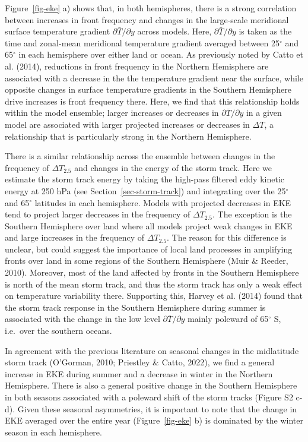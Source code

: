 \documentclass[
]{agujournal2019}
\begin{document}
Figure~\ref{fig-eke} a) shows that, in both hemispheres, there is a
strong correlation between increases in front frequency and changes in
the large-scale meridional surface temperature gradient
\(\partial \bar{T} / \partial y\) across models. Here,
\(\partial \bar{T} / \partial y\) is taken as the time and zonal-mean
meridional temperature gradient averaged between 25\(^{\circ}\) and
65\(^{\circ}\) in each hemisphere over either land or ocean. As
previously noted by Catto et al. (2014), reductions in front frequency
in the Northern Hemisphere are associated with a decrease in the the
temperature gradient near the surface, while opposite changes in surface
temperature gradients in the Southern Hemisphere drive increases is
front frequency there. Here, we find that this relationship holds within
the model ensemble; larger increases or decreases in
\(\partial \bar{T} / \partial y\) in a given model are associated with
larger projected increases or decreases in \(\Delta T\), a relationship
that is particularly strong in the Northern Hemisphere.

There is a similar relationship across the ensemble between changes in
the frequency of \(\Delta T_{2.5}\) and changes in the energy of the
storm track. Here we estimate the storm track energy by taking the
high-pass filtered eddy kinetic energy at 250 hPa (see
Section~\ref{sec-storm-track}) and integrating over the 25\(^{\circ}\)
and 65\(^{\circ}\) latitudes in each hemisphere. Models with projected
decreases in EKE tend to project larger decreases in the frequency of
\(\Delta T_{2.5}\). The exception is the Southern Hemisphere over land
where all models project weak changes in EKE and large increases in the
frequency of \(\Delta T_{2.5}\). The reason for this difference is
unclear, but could suggest the importance of local land processes in
amplifying fronts over land in some regions of the Southern Hemisphere
(Muir \& Reeder, 2010). Moreover, most of the land affected by fronts in
the Southern Hemisphere is north of the mean storm track, and thus the
storm track has only a weak effect on temperature variability there.
Supporting this, Harvey et al. (2014) found that the storm track
response in the Southern Hemisphere during summer is associated with the
change in the low level \(\partial \bar{T} / \partial y\) mainly
poleward of 65\(^{\circ}\) S, i.e.~over the southern oceans.

In agreement with the previous literature on seasonal changes in the
midlatitude storm track (O'Gorman, 2010; Priestley \& Catto, 2022), we
find a general increase in EKE during summer and a decrease in winter in
the Northern Hemisphere. There is also a general positive change in the
Southern Hemisphere in both seasons associated with a poleward shift of
the storm tracks (Figure S2 c-d). Given these seasonal asymmetries, it
is important to note that the change in EKE averaged over the entire
year (Figure~\ref{fig-eke} b) is dominated by the winter season in each
hemisphere.
\end{document}
